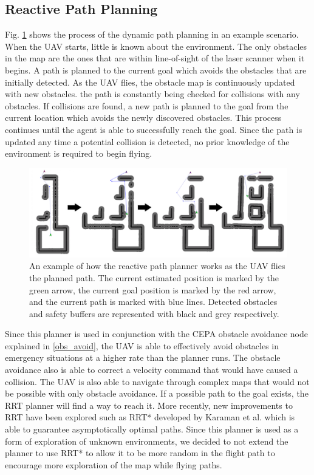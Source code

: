 \documentclass[letterpaper, 10 pt, conference]{ieeeconf}  %
\begin{document}
\subsection{Reactive Path Planning}

Fig. \ref{fig:reactive_plan} shows the process of the dynamic path planning in an example scenario. When the UAV starts, little is known about the environment. The only obstacles in the map are the ones that are within line-of-sight of the laser scanner when it begins. A path is planned to the current goal which avoids the obstacles that are initially detected. As the UAV flies, the obstacle map is continuously updated with new obstacles. the path is constantly being checked for collisions with any obstacles. If collisions are found, a new path is planned to the goal from the current location which avoids the newly discovered obstacles. This process continues until the agent is able to successfully reach the goal. Since the path is updated any time a potential collision is detected, no prior knowledge of the environment is required to begin flying.

\begin{figure}
\centering
\includegraphics[width=1.0\linewidth]{adaptive_path_plan2.png}
\caption{An example of how the reactive path planner works as the UAV flies the planned path. The current estimated position is marked by the green arrow, the current goal position is marked by the red arrow, and the current path is marked with blue lines. Detected obstacles and safety buffers are represented with black and grey respectively.}
\label{fig:reactive_plan}
\end{figure}

Since this planner is used in conjunction with the CEPA obstacle avoidance node explained in \ref{obs_avoid}, the UAV is able to effectively avoid obstacles in emergency situations at a higher rate than the planner runs. The obstacle avoidance also is able to correct a velocity command that would have caused a collision. The UAV is also able to navigate through complex maps that would not be possible with only obstacle avoidance. If a possible path to the goal exists, the RRT planner will find a way to reach it. More recently, new improvements to RRT have been explored such as RRT* developed by Karaman et al. \cite{Karaman2011} which is able to guarantee asymptotically optimal paths. Since this planner is used as a form of exploration of unknown environments, we decided to not extend the planner to use RRT* to allow it to be more random in the flight path to encourage more exploration of the map while flying paths.
\end{document}
